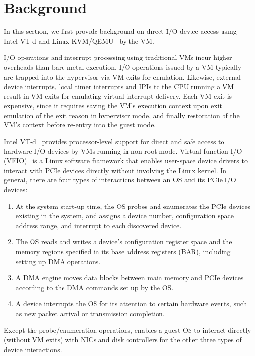 
\section{Background}
In this section, we first provide background on direct I/O
device access using Intel VT-d and Linux KVM/QEMU~\cite{kvm}
by the VM.

I/O operations and interrupt processing using traditional VMs
incur higher overheads than bare-metal execution. I/O
operations issued by a VM typically are trapped into the
hypervisor via VM exits for emulation. Likewise, external
device interrupts, local timer interrupts and IPIs to the CPU
running a VM result in VM exits for emulating virtual
interrupt delivery. Each VM exit is expensive, since it
requires saving the VM's execution context upon exit,
emulation of the exit reason in hypervisor mode, and finally
restoration of the VM's context before re-entry into the guest
mode.

Intel VT-d~\cite{intelvtd-paper} provides processor-level
support for direct and safe access to hardware I/O devices by
VMs running in non-root mode.  Virtual function I/O
(VFIO)~\cite{vfio} is a Linux software framework that enables
user-space device drivers to interact with PCIe devices
directly without involving the Linux kernel.  In general,
there are four types of interactions between an OS and its
PCIe I/O devices:

\begin{enumerate}
\parskip 0mm
\itemsep 0mm
\item At the system start-up time, the OS probes and
      enumerates the PCIe devices existing in the system, and
      assigns a device number, configuration space address
      range, and interrupt to each discovered device.

\item The OS reads and writes a device's configuration
      register space and the memory regions specified in its
      base address registers (BAR), including setting up DMA
      operations.

\item A DMA engine moves data blocks between main memory and
      PCIe devices according to the DMA commands set up by the
      OS.

\item A device interrupts the OS for its attention to certain
      hardware events, such as new packet arrival or
      transmission completion.

\end{enumerate}
Except the probe/enumeration operations, \na enables a guest
OS to interact directly (without VM exits) with NICs and disk
controllers for the other three types of device interactions.


